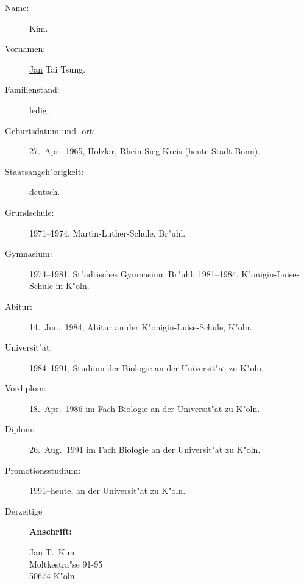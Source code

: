 \begin{appendix}
\begin{description}

\item[Name:] Kim.

\item[Vornamen:] \underline{Jan} Tai Tsung.

\item[Familienstand:] ledig.

\item[Geburtsdatum und -ort:] 27.\ Apr.\ 1965, Holzlar, Rhein-Sieg-Kreis (heute Stadt Bonn).

\item[Staatsangeh"origkeit:] deutsch.

\item[Grundschule:] 1971--1974, Martin-Luther-Schule, Br"uhl.

\item[Gymnasium:] \begin{sloppypar} 1974--1981, St"adtisches Gymnasium Br"uhl;
    1981--1984, K"o\-nig\-in-Lu\-ise-Schu\-le in K"oln.
    \end{sloppypar}

\item[Abitur:] 14.\ Jun.\ 1984, Abitur an der K"onigin-Luise-Schule, K"oln.

\item[Universit"at:] 1984--1991, Studium der Biologie an der Universit"at
    zu K"oln.

\item[Vordiplom:] 18.\ Apr.\ 1986 im Fach Biologie an der Universit"at zu K"oln.

\item[Diplom:] 26.\ Aug.\ 1991 im Fach Biologie an der Universit"at zu K"oln.

\item[Promotionsstudium:] 1991--heute, an der Universit"at zu K"oln.

\item[Derzeitige] {\bf Anschrift:}
{\flushleft
  Jan T.\ Kim \\
  Moltkestra"se 91-95 \\
  50674 K"oln

}
\end{description}
\end{appendix}
